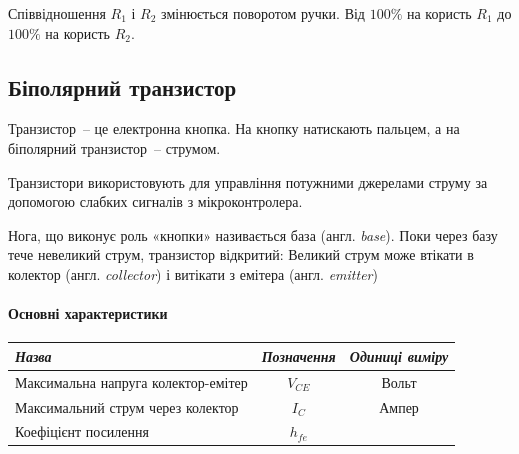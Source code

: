\documentclass[12pt,a4paper]{report}  %
\begin{document}

Співвідношення $R_1$ і $R_2$ змінюється поворотом ручки. Від $100\%$ на користь $R_1$ до $100\%$ на користь $R_2$.

\subsection{Біполярний транзистор}

Транзистор~-- це електронна кнопка. На кнопку натискають пальцем, а на біполярний транзистор~-- струмом.

\begin{figure}[h!]
\label{ris:image}
\end{figure}


Транзистори використовують для управління потужними джерелами струму за допомогою слабких сигналів з мікроконтролера.

Нога, що виконує роль «кнопки» називається база (англ. \textit{base}).
Поки через базу тече невеликий струм, транзистор відкритий:
Великий струм може втікати в колектор (англ. \textit{collector}) і витікати з емітера (англ. \textit{emitter})

\paragraph{Основні характеристики}
\begin{center}
\begin{tabular}{|l|c|c|}
\hline
\textit{Назва} & \textit{Позначення} & \textit{Одиниці виміру} \\
\hline
Максимальна напруга колектор-емітер & $V_{CE}$ & Вольт \\
\hline		
Максимальний струм через колектор & $I_C$ & Ампер \\
\hline
Коефіцієнт посилення & $h_{fe}$ & ~ \\
\hline
\end{tabular}
\end{center}
\end{document}
